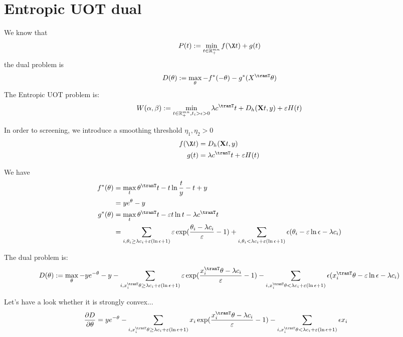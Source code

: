 
\section{Entropic UOT dual}
We know that 
\begin{equation}
P(t):= \min_{t \in \mathbb{R}_{+}^{mn}} f(\X t) + g(t)
\end{equation}
the dual problem is 
\begin{equation}
D(\theta) := \max_{\theta} -f^*(-\theta) - g^*(X^{\tranT}\theta)
\end{equation}
The Entropic UOT problem is:
\begin{equation}
\label{eq:euot}
W(\alpha,\beta) := \min_{t \in \mathbb{R}_{+}^{mn}, t_i>\epsilon>0} \lambda c^{\tranT}t + D_h(\mathbf{X}t,y) + \varepsilon H(t)
\end{equation}

In order to screening, we introduce a smoothing threshold $\eta_1,\eta_2 > 0$ 
$$
\begin{aligned}
f(\X t) &=  D_h(\mathbf{X}t,y) \\
g(t) &= \lambda c^{\tranT} t + \varepsilon H(t)
\end{aligned}
$$

We have 
$$
\begin{aligned}
f^{*}(\theta) &= \max_t \theta^{\tranT} t - t\ln \frac{t}{y} - t+y\\
&=ye^{\theta} - y\\
g^{*}(\theta) &= \max_t \theta^{\tranT} t - \varepsilon t\ln t - \lambda c^{\tranT}t\\
&= \sum_{i,\theta_i\geq\lambda c_i +\varepsilon(\ln \epsilon + 1)} \varepsilon \exp(\frac{\theta_i-\lambda c_i}{\varepsilon}-1)+\sum_{i,\theta_i<\lambda c_i +\varepsilon(\ln \epsilon + 1)} \epsilon(\theta_i - \varepsilon\ln\epsilon-\lambda c_i)
\end{aligned}
$$

The dual problem is:
\begin{equation}
\label{eq:reuot}
D(\theta) := \max_{\theta} -ye^{-\theta} - y - \sum_{i,x_i^{\tranT}\theta\geq\lambda c_i +\varepsilon(\ln \epsilon + 1)} \varepsilon \exp(\frac{x_i^{\tranT}\theta-\lambda c_i}{\varepsilon}-1) - \sum_{i,x_i^{\tranT}\theta<\lambda c_i +\varepsilon(\ln \epsilon + 1)} \epsilon(x_i^{\tranT}\theta - \varepsilon\ln\epsilon-\lambda c_i)
\end{equation}

Let's have a look whether it is strongly convex...
$$
\begin{aligned}
\frac{\partial D}{\partial \theta} &=  ye^{-\theta} -  \sum_{i,x_i^{\tranT}\theta\geq\lambda c_i +\varepsilon(\ln \epsilon + 1)} x_i\exp(\frac{x_i^{\tranT}\theta-\lambda c_i}{\varepsilon}-1) -\sum_{i,x_i^{\tranT}\theta<\lambda c_i +\varepsilon(\ln \epsilon + 1)} \epsilon x_i
\end{aligned}
$$

